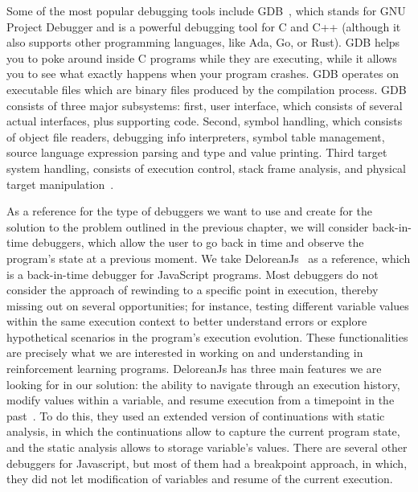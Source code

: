 Some of the most popular debugging tools include \ac{GDB}~\cite{stallman11}, 
which stands for GNU Project Debugger and is a powerful 
debugging tool for C and C++ (although it also supports other programming languages,
like Ada, Go, or Rust). GDB helps you to poke around inside C programs while 
they are executing, while it allows you to see what exactly happens when your program 
crashes. \ac{GDB} operates on executable files which are binary files produced by the 
compilation process. \ac{GDB} consists of three major subsystems: first, user interface, which 
consists of several actual interfaces, plus supporting code. Second, symbol handling, 
which consists of object file readers, debugging info interpreters, symbol table 
management, source language expression parsing and type and value printing. Third target 
system handling, consists of execution control, stack frame analysis, and 
physical target manipulation~\cite{stallman11}.

As a reference for the type of debuggers we want to use and create for the solution 
to the problem outlined in the previous chapter, we will consider back-in-time 
debuggers, which allow the user to go back in time and observe the program's state 
at a previous moment. We take DeloreanJs~\cite{leger23} as a reference, 
which is a back-in-time debugger for JavaScript programs. Most debuggers do not 
consider the approach of rewinding to a specific point in execution, thereby 
missing out on several opportunities; for instance, testing different variable 
values within the same execution context to better understand errors or explore 
hypothetical scenarios in the program's execution evolution. These functionalities 
are precisely what we are interested in working on and understanding in 
reinforcement learning programs. DeloreanJs has three main features we are looking 
for in our solution: the ability to navigate through an execution history, modify 
values within a variable, and resume execution from a timepoint in the 
past~\cite{leger23}. To do this, they used an extended version of continuations 
with static analysis, in which the continuations allow to capture the current program 
state, and the static analysis allows to storage variable's values. There are several 
other debuggers for Javascript, but most of them had a breakpoint approach, in which,
they did not let modification of variables and resume of the current execution.

